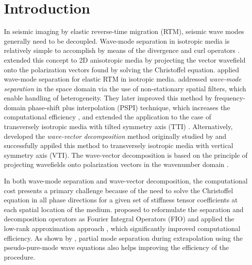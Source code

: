\section{Introduction}
In seismic imaging by elastic reverse-time migration (RTM),  seismic wave modes generally need to be decoupled. Wave-mode separation in isotropic media is relatively simple to accomplish by means of the divergence and curl operators \cite[]{akirichards}. \cite{joejohn} extended this concept to 2D anisotropic media by projecting the vector wavefield onto the polarization vectors found by solving the Christoffel equation. 
\cite{yaniso} applied wave-mode separation for elastic RTM in isotropic media. \cite{yanvti} addressed \textit{wave-mode separation} in the space domain via the use of non-stationary spatial filters, which enable handling of heterogeneity.
They later improved this method by frequency-domain phase-shift plus interpolation (PSPI) technique,
which increases the computational efficiency \cite[]{yanpspi}, and extended the application to the case of transversely isotropic media with tilted symmetry axis (TTI) \cite[]{yantti}. Alternatively, \cite{zm} developed the \textit{wave-vector decomposition} method originally studied by \cite{joethesis} and successfully appiled this method to transversely isotropic media with vertical symmetry axis (VTI). The wave-vector decomposition is based on the principle of projecting wavefields onto polarization vectors in the wavenumber domain \cite[]{joethesis}.

In both wave-mode separation and wave-vector decomposition, the computational cost presents a primary challenge because of the need to solve the Christoffel equation in all phase directions for a given set of stiffness tensor coefficients at each spatial location of the medium. \cite{chengfomel} proposed to reformulate the separation and decomposition operators as Fourier Integral Operators (FIO) and applied the low-rank approximation approach \cite[]{fomellr}, which significantly improved computational efficiency. As shown by  \cite{chengpseudop,chengpseudos}, partial mode separation during extrapolation using the pseudo-pure-mode wave equations also helps improving the efficiency of the procedure.

